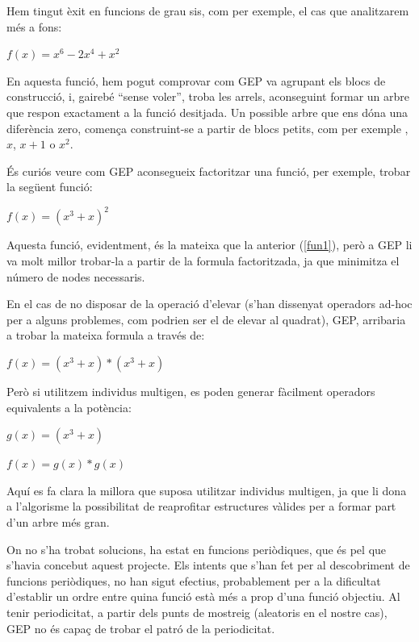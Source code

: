 Hem tingut èxit en funcions de grau sis, com per exemple, el cas que analitzarem
més a fons:

\begin{center}
	\label{fun1} 
	$f(x)=x^6-2x^4+x^2$
\end{center}

En aquesta funció, hem pogut comprovar com GEP va agrupant els blocs de
construcció, i, gairebé ``sense voler'', troba les arrels, aconseguint formar un
arbre que respon exactament a la funció desitjada. Un possible arbre que ens
dóna una diferència zero, comença construint-se a partir de blocs petits, com
per exemple , $x$, $x+1$ o $x^2$.


És curiós veure com GEP aconsegueix factoritzar una funció, per exemple, trobar
la següent funció:

\begin{center}
	$f(x) = (x^3 + x)^2 $
\end{center}

Aquesta funció, evidentment, és la mateixa que la anterior (\ref{fun1}), però a
GEP li va molt millor trobar-la a partir de la formula factoritzada, ja que
minimitza el número de nodes necessaris.

En el cas de no disposar de la operació d'elevar (s'han dissenyat operadors
ad-hoc per a alguns problemes, com podrien ser el de elevar al quadrat), GEP,
arribaria a trobar la mateixa formula a través de:

\begin{center}
	$f(x) = (x^3 + x) * (x^3 + x) $
\end{center}


Però si utilitzem individus multigen, es poden generar fàcilment operadors equivalents a la
potència:

\begin{center}
	$g(x) = (x^3 + x)$

	$f(x) = g(x) * g(x)$
\end{center}

Aquí es fa clara la millora que suposa utilitzar individus multigen, ja que li
dona a l'algorisme la possibilitat de reaprofitar estructures vàlides per a
formar part d'un arbre més gran.

On no s'ha trobat solucions, ha estat en funcions periòdiques, que és pel que
s'havia concebut aquest projecte.  Els intents que s'han fet per al descobriment
de funcions periòdiques, no han sigut efectius, probablement per a la dificultat
d'establir un ordre entre quina funció està més a prop d'una funció objectiu.
Al tenir periodicitat, a partir dels punts de mostreig (aleatoris en el nostre
cas), GEP no és capaç de trobar el patró de la periodicitat.

